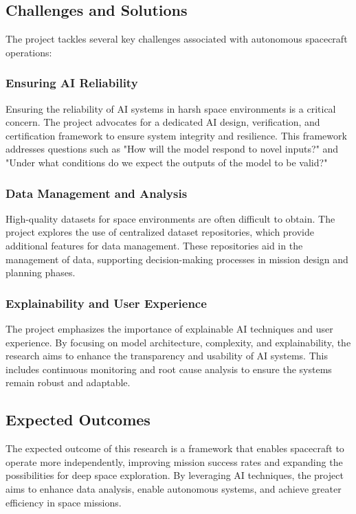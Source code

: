 \documentclass[a4paper,12pt]{article}
\begin{document}
\subsection{Challenges and Solutions}

The project tackles several key challenges associated with autonomous spacecraft operations:

\subsubsection{Ensuring AI Reliability}

Ensuring the reliability of AI systems in harsh space environments is a critical concern. The project advocates for a dedicated AI design, verification, and certification framework to ensure system integrity and resilience. This framework addresses questions such as "How will the model respond to novel inputs?" and "Under what conditions do we expect the outputs of the model to be valid?"

\subsubsection{Data Management and Analysis}

High-quality datasets for space environments are often difficult to obtain. The project explores the use of centralized dataset repositories, which provide additional features for data management. These repositories aid in the management of data, supporting decision-making processes in mission design and planning phases.

\subsubsection{Explainability and User Experience}

The project emphasizes the importance of explainable AI techniques and user experience. By focusing on model architecture, complexity, and explainability, the research aims to enhance the transparency and usability of AI systems. This includes continuous monitoring and root cause analysis to ensure the systems remain robust and adaptable.

\subsection{Expected Outcomes}

The expected outcome of this research is a framework that enables spacecraft to operate more independently, improving mission success rates and expanding the possibilities for deep space exploration. By leveraging AI techniques, the project aims to enhance data analysis, enable autonomous systems, and achieve greater efficiency in space missions.
\end{document}
